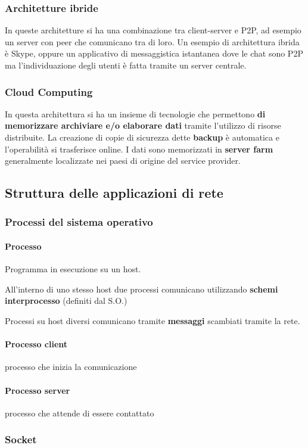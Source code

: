         \subsubsection{Architetture ibride}
            In queste architetture si ha una combinazione tra client-server e P2P, ad esempio un server con peer che comunicano tra di loro. Un esempio di architettura ibrida è Skype, oppure un applicativo di messaggistica istantanea dove le chat sono P2P ma l'individuazione degli utenti è fatta tramite un server centrale.
        \subsubsection{Cloud Computing}
            In questa architettura si ha un insieme di tecnologie che permettono \textbf{di memorizzare archiviare e/o elaborare dati} tramite l'utilizzo di risorse distribuite. La creazione di copie di sicurezza dette \textbf{backup} è automatica e l'operabilità si trasferisce online. I dati sono memorizzati in \textbf{server farm} generalmente localizzate nei paesi di origine del service provider.
    \subsection{Struttura delle applicazioni di rete}
        \subsubsection{Processi del sistema operativo}
            \paragraph{Processo} Programma in esecuzione su un host.
            
            All'interno di uno stesso host due processi comunicano utilizzando \textbf{schemi interprocesso} (definiti dal S.O.)

            Processi su host diversi comunicano tramite \textbf{messaggi} scambiati tramite la rete.
            \paragraph{Processo client} processo che inizia la comunicazione
            \paragraph{Processo server} processo che attende di essere contattato
        \subsubsection{Socket}

